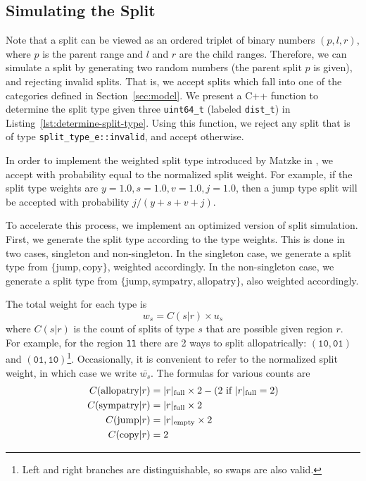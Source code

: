 \documentclass{article}
\begin{document}
\subsection{Simulating the Split}

Note that a split can be viewed as an ordered triplet of binary numbers \(
(p,l,r) \), where $p$ is the parent range and $l$ and $r$ are the child ranges.
Therefore, we can simulate a split by generating two random numbers (the parent
split $p$ is given), and rejecting invalid splits.
That is, we accept splits which fall into one of the categories defined in
Section~\ref{sec:model}.
We present a C++ function to determine the split type given three
\texttt{uint64_t} (labeled \texttt{dist_t}) in
Listing~\ref{lst:determine-split-type}.
Using this function, we reject any split that is of type
\texttt{split_type_e::invalid}, and accept otherwise.

In order to implement the weighted split type introduced by Matzke in
\cite{ModelSelectionMatzke2014}, we accept with probability equal to the
normalized split weight.
For example, if the split type weights are $y = 1.0, s = 1.0, v = 1.0, j=1.0$,
then a jump type split will be accepted with probability $j/(y + s + v +
j)$\footnotemark.

To accelerate this process, we implement an optimized version of split
simulation.
First, we generate the split type according to the type weights.
This is done in two cases, singleton and non-singleton.
In the singleton case, we generate a split type from $\{\text{jump},
\text{copy}\}$, weighted accordingly.
In the non-singleton case, we generate a split type from $\{\text{jump},
\text{sympatry}, \text{allopatry}\}$, also weighted accordingly.

The total weight for each type is
\begin{equation}
	w_s = C(s|r) \times u_s
\end{equation}
where $C(s|r)$ is the count of splits of type $s$ that are
possible given region $r$.
For example, for the region \texttt{11} there are 2 ways to split
allopatrically: $(\texttt{10}, \texttt{01})$ and $(\texttt{01},
\texttt{10})$\footnote{Left and right branches are distinguishable, so swaps
	are also valid.}\footnotemark.
Occasionally, it is convenient to refer to the normalized split weight, in
which case we write \( \overline{w_s} \).
The formulas for various counts are
\begin{align*}
  C(\text{allopatry}|r) & =
  |r|_\text{full} \times 2 - (2 \text{ if } |r|_\text{full} = 2) \\
  C(\text{sympatry}|r)  & = |r|_\text{full} \times 2           \\ C(\text{jump}|r) & =
  |r|_\text{empty} \times 2                                    \\ C(\text{copy}|r) & = 2 \\
\end{align*}
\end{document}

